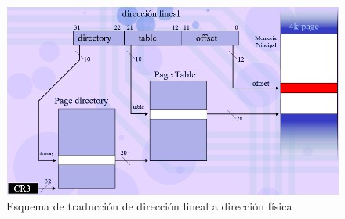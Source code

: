 \documentclass[a4paper]{article}
\begin{document}
\begin{figure}[!htb]
  \begin{center}
	\includegraphics[scale=0.6]{img/esquemaPaginacion.png}
	\caption{Esquema de traducción de dirección lineal a dirección física}
  \end{center}
\end{figure}
\end{document}
